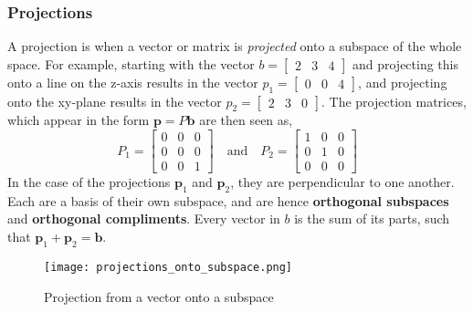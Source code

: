         \subsubsection{Projections}
            A projection is when a vector or matrix is \textit{projected} onto a subspace of the whole space. For 
            example, starting with the vector \(b = \begin{bmatrix} 2 & 3 & 4 \end{bmatrix}\) and projecting this onto
            a line on the z-axis results in the vector \(p_1 = \begin{bmatrix} 0 & 0 & 4 \end{bmatrix}\), and 
            projecting onto the xy-plane results in the vector \(p_2 = \begin{bmatrix} 2 & 3 & 0 \end{bmatrix}\). 
            The projection matrices, which appear in the form \(\boldsymbol{p}=P\boldsymbol{b}\) are then seen as,
            \begin{equation}
                P_1 = 
                \begin{bmatrix}
                    0 & 0 & 0 \\
                    0 & 0 & 0 \\
                    0 & 0 & 1
                \end{bmatrix}
                \quad \textrm{and} \quad
                P_2 = 
                \begin{bmatrix}
                    1 & 0 & 0 \\
                    0 & 1 & 0 \\
                    0 & 0 & 0
                \end{bmatrix}
            \end{equation}
            In the case of the projections \(\boldsymbol{p}_1\) and \(\boldsymbol{p}_2\), they are perpendicular to one
            another. Each are a basis of their own subspace, and are hence \textbf{orthogonal subspaces} and \textbf{
            orthogonal compliments}. Every vector in \(b\) is the sum of its parts, such that \(\boldsymbol{p}_1 + 
            \boldsymbol{p}_2 = \boldsymbol{b}\).

            \begin{figure}[h]
                \texttt{[image: projections\_onto\_subspace.png]}
                \centering
                \caption{Projection from a vector onto a subspace}
            \end{figure}

